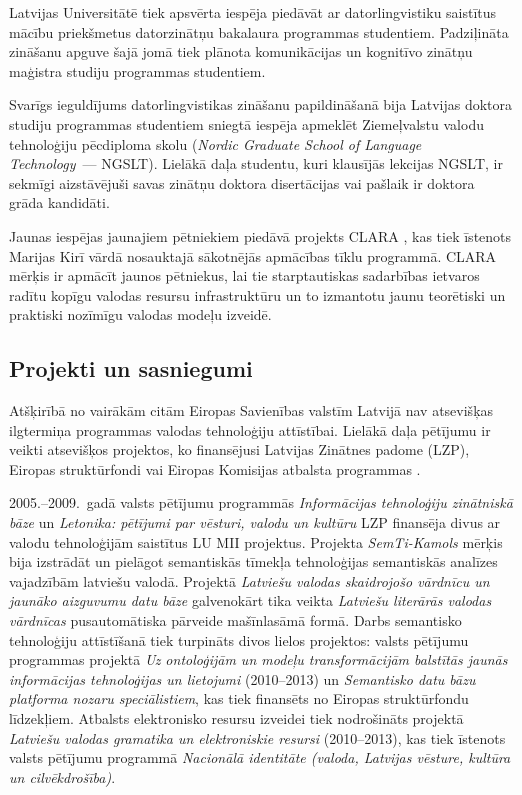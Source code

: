 \begin{multicols}{2}
Latvijas Universitātē tiek apsvērta iespēja piedāvāt ar datorlingvistiku saistītus mācību priekšmetus datorzinātņu bakalaura programmas studentiem. 
Padziļināta zināšanu apguve šajā jomā tiek plānota komunikācijas un kognitīvo zinātņu maģistra studiju programmas studentiem.

Svarīgs ieguldījums datorlingvistikas zināšanu papildināšanā bija Latvijas doktora studiju programmas studentiem sniegtā iespēja apmeklēt Ziemeļvalstu valodu tehnoloģiju pēcdiploma skolu (\textit{Nordic Graduate School of Language Technology}~--- NGSLT). Lielākā daļa studentu, kuri klausījās lekcijas NGSLT, ir sekmīgi aizstāvējuši savas zinātņu doktora disertācijas vai pašlaik ir doktora grāda kandidāti.

Jaunas iespējas jaunajiem pētniekiem piedāvā projekts \mbox{CLARA} \cite{Meta38}, kas tiek īstenots Marijas Kirī vārdā nosauktajā sākotnējās apmācības tīklu pro\-grammā. 
\mbox{CLARA} mērķis ir apmācīt jaunos pētniekus, lai tie starptautiskas sadarbības ietvaros radītu kopīgu valodas resursu infrastruktūru un to izmantotu jaunu teorētiski un praktiski nozīmīgu valodas modeļu izveidē.

\subsection{Projekti un sasniegumi}

Atšķirībā no vairākām citām Eiropas Savienības valstīm Latvijā nav atsevišķas ilgtermiņa programmas valodas tehnoloģiju attīstībai.  Lielākā daļa pētījumu ir veikti atsevišķos projektos, ko finansējusi Latvijas Zinātnes padome (LZP), Eiropas struktūrfondi vai Eiropas Komisijas atbalsta programmas \cite{Meta2}.

2005.--2009.~gadā valsts pētījumu programmās \textit{Informācijas tehnoloģiju zinātniskā bāze} un \textit{Letonika: pētījumi par vēsturi, valodu un kultūru} LZP finansēja divus ar valodu tehnoloģijām saistītus LU MII projektus.  Projekta \textit{SemTi-Kamols} \cite{Meta39} mērķis bija izstrādāt un pielāgot semantiskās tīmekļa tehnoloģijas semantiskās analīzes vajadzībām latviešu valodā.  Projektā \textit{Latviešu valodas skaidrojošo vārdnīcu un jaunāko aizguvumu datu bāze} galvenokārt tika veikta \textit{Latviešu literārās valodas vārdnīcas} pusautomātiska pārveide mašīnlasāmā formā.  Darbs semantisko tehnoloģiju attīstīšanā tiek turpināts divos lielos projektos: valsts pētījumu programmas projektā \textit{Uz ontoloģijām un modeļu transformācijām balstītās jaunās informācijas tehnoloģijas un lietojumi} (2010--2013) un \textit{Semantisko datu bāzu platforma nozaru speciālistiem}, kas tiek finansēts no Eiropas struktūrfondu līdzekļiem.  Atbalsts elektronisko resursu izveidei tiek nodrošināts projektā \textit{Latviešu valodas gramatika un elektroniskie resursi} (2010–2013), kas tiek īstenots valsts pētījumu programmā \textit{Nacionālā identitāte (valoda, Latvijas vēsture, kultūra un cilvēkdrošība)}.


\end{multicols}

